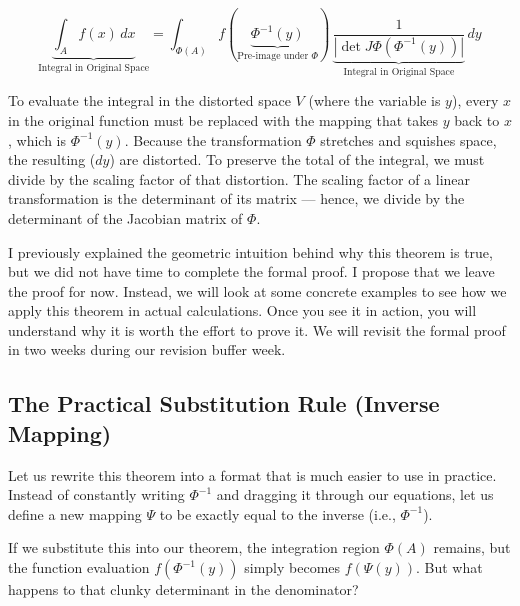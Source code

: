 \begin{math-stroke}
\begin{equation} \label{eq:cov_clunky}
\underbrace{\int_A f(x) \, dx}_{\text{Integral in Original Space}} = \int_{\Phi(A)} f(\underbrace{\Phi^{-1}(y)}_{\text{Pre-image under }\Phi}) \, \underbrace{\frac{1}{|\det J\Phi(\Phi^{-1}(y))|}}_{\text{Integral in Original Space}} \, dy
\end{equation}

\begin{explanation-of-steps}
To evaluate the integral in the distorted space $V$ (where the variable is $y$), every $x$ in the original function must be replaced with the mapping that takes $y$ back to $x$, which is $\Phi^{-1}(y)$. Because the transformation $\Phi$ stretches and squishes space, the resulting  ($dy$) are distorted. To preserve the total  of the integral, we must divide by the scaling factor of that distortion. The scaling factor of a linear transformation is the determinant of its matrix — hence, we divide by the determinant of the Jacobian matrix of $\Phi$.
\end{explanation-of-steps}
\end{math-stroke}

\begin{spoken-clean}[00:03:50 - 00:06:50]
I previously explained the geometric intuition behind why this theorem is true, but we did not have time to complete the formal proof. I propose that we leave the proof for now. Instead, we will look at some concrete examples to see how we apply this theorem in actual calculations. Once you see it in action, you will understand why it is worth the effort to prove it. We will revisit the formal proof in two weeks during our revision buffer week. 
\end{spoken-clean}

\subsection{The Practical Substitution Rule (Inverse Mapping)}

\begin{spoken-clean}[00:06:50 - 00:08:20]
Let us rewrite this theorem into a format that is much easier to use in practice. Instead of constantly writing $\Phi^{-1}$ and dragging it through our equations, let us define a new mapping $\Psi$ to be exactly equal to the inverse (i.e., $\Phi^{-1}$). 

If we substitute this into our theorem, the integration region $\Phi(A)$ remains, but the function evaluation $f(\Phi^{-1}(y))$ simply becomes $f(\Psi(y))$. But what happens to that clunky determinant in the denominator? 
\end{spoken-clean}

